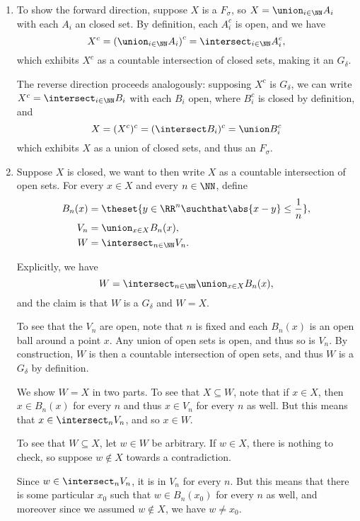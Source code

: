 \begin{solution}\hfill
\begin{enumerate}
  \item To show the forward direction, suppose $X$ is a $F_\sigma$, so $X = \union_{i\in\NN} A_i$ with each $A_i$ an closed set. By definition, each $A_i^c$ is open, and we have
    $$
    X^c = \left( \union_{i\in \NN}A_i \right)^c = \intersect_{i\in\NN} A_i^c,
    $$
    which exhibits $X^c$ as a countable intersection of closed sets, making it an $G_\delta$.

    The reverse direction proceeds analogously: supposing $X^c$ is $G_\delta$, we can write $X^c = \intersect_{i\in\NN} B_i$ with each $B_i$ open, where $B_i^c$ is closed by definition, and
    $$
    X = (X^c)^c = (\intersect B_i)^c = \union B_i^c
    $$
    which exhibits $X$ as a union of closed sets, and thus an $F_\sigma$.

  \item Suppose $X$ is closed, we want to then write $X$ as a countable intersection of open sets.
    For every $x\in X$ and every $n\in \NN$, define
\[
  \begin{align*}
    B_n(x) &= \theset{y\in \RR^n \suchthat \abs{x - y} \leq \frac 1 n}, \\
    V_n &= \union_{x\in X} B_n(x), \\
    W &= \intersect_{n \in \NN} V_n
  .\end{align*}
\]

  Explicitly, we have
  $$W = \intersect_{n\in \NN} \union_{x\in X} B_n(x),
  $$
  and the claim is that $W$ is a $G_\delta$ and $W = X$.

  To see that the $V_n$ are open, note that $n$ is fixed and each $B_n(x)$ is an open ball around a point $x$. Any union of open sets is open, and thus so is $V_n$. By construction, $W$ is then a countable intersection of open sets, and thus $W$ is a $G_\delta$ by definition.

  We show $W=X$ in two parts. To see that $X \subseteq W$, note that if $x\in X$, then $x \in B_n(x)$ for every $n$ and thus $x \in V_n$ for every $n$ as well. But this means that $x \in \intersect_n V_n$, and so $x\in W$.

  To see that $W \subseteq X$, let $w\in W$ be arbitrary. If $w\in X$, there is nothing to check, so suppose $w\not\in X$ towards a contradiction.

  Since $w \in \intersect_n V_n$, it is in $V_n$ for every $n$. But this means that there is some particular $x_0$ such that $w \in B_n(x_0)$ for every $n$ as well, and moreover since we assumed $w\not\in X$, we have $w\neq x_0$.


\end{enumerate}
\end{solution}

